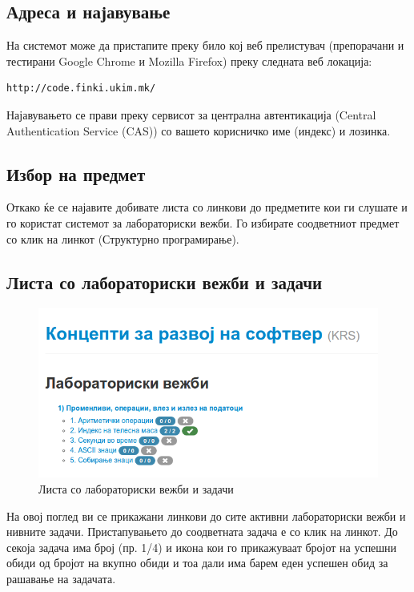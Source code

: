 \subsection{Адреса и најавување}

На системот може да пристапите преку било кој веб прелистувач (препорачани и
тестирани Google Chrome и Mozilla Firefox) преку следната веб локација:

\begin{verbatim}
http://code.finki.ukim.mk/
\end{verbatim}

Најавувањето се прави преку сервисот за централна автентикација (Central
Authentication Service (CAS)) со вашето корисничко име (индекс) и лозинка.

\subsection{Избор на предмет}

Откако ќе се најавите добивате листа со линкови до предметите кои ги слушате и
го користат системот за лабораториски вежби. Го избирате соодветниот предмет со
клик на линкот (Структурно програмирање).

\subsection{Листа со лабораториски вежби и задачи}

\begin{figure}[htbp]
\centering
\includegraphics[scale=.5]{images/code/krs}
\caption{Листа со лабораториски вежби и задачи}
\end{figure}

На овој поглед ви се прикажани линкови до сите активни лабораториски вежби и
нивните задачи. Пристапувањето до соодветната задача е со клик на линкот. До
секоја задача има број (пр. 1/4) и икона кои го прикажуваат бројот на успешни
обиди од бројот на вкупно обиди и тоа дали има барем еден успешен обид за
рашавање на задачата.

